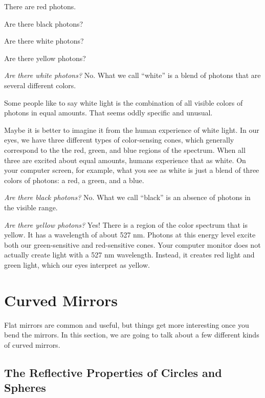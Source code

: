 \begin{Exercise}[title={Photons and Color}, label=photon_color]

  There are red photons.

  Are there black photons?

  Are there white photons?

  Are there yellow photons?
  
\end{Exercise}
\begin{Answer}
  
\textit{Are there white photons?}  No. What we call ``white'' is a
blend of photons that are several different colors.

Some people like to say white light is the combination of all visible
colors of photons in equal amounts. That seems oddly specific and unusual.

Maybe it is better to imagine it from the human experience of white
light. In our eyes, we have three different types of color-sensing
cones, which generally correspond to the the red, green, and
blue regions of the spectrum.  When all three are excited about equal
amounts, humans experience that as white.  On your computer screen,
for example, what you see as white is just a blend of three colors of
photons: a red, a green, and a blue.

\textit{Are there black photons?}  No. What we call ``black'' is an
absence of photons in the visible range.

\textit{Are there yellow photons?} Yes! There is a region of the color
spectrum that is yellow. It has a wavelength of about 527 nm.  Photons
at this energy level excite both our green-sensitive and red-sensitive
cones.
Your computer monitor does not actually create light with a 527 nm
wavelength. Instead, it creates red light and green light, which our
eyes interpret as yellow.

\end{Answer}

\section{Curved Mirrors}

Flat mirrors are common and useful, but things get more interesting
once you bend the mirrors. In this section, we are going to talk about
a few different kinds of curved mirrors.

\subsection{The Reflective Properties of Circles and Spheres}

